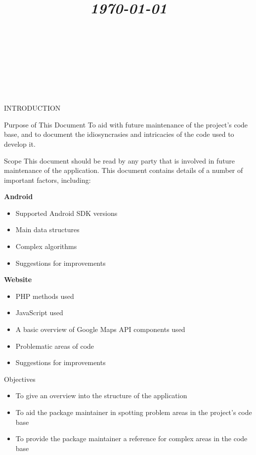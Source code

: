 \documentclass{article}
\title{
	\vspace{1.2in}
	\textmd{\textbf{\doctitle}} \\
	\vspace{0.1in}\large{\textit{\today}} \\
	\vspace{0.4in}
	{\bf{\qanumber}} \\ \vspace{0.4in}
	\version \\
	\status \\
	\vspace{0.4in}
}
\author{\authors}
\date{}
\begin{document}
	\maketitle
	\newpage
	\tableofcontents
	\newpage

	\begin{section}{INTRODUCTION}
		\begin{subsection}{Purpose of This Document}
			To aid with future maintenance of the project's code base, and to document the idiosyncrasies and intricacies of the code used to develop it.
		\end{subsection}
	
		\begin{subsection}{Scope}
			This document should be read by any party that is involved in future maintenance of the application. This document contains details of a number of important factors, including:
			
			{\bf Android}
			\begin{itemize}
				\item{Supported Android SDK versions}
				\item{Main data structures}
				\item{Complex algorithms}
				\item{Suggestions for improvements}
			\end{itemize}
			
			{\bf Website}
			\begin{itemize}
				\item{PHP methods used}
				\item{JavaScript used}
				\item{A basic overview of Google Maps API components used}
				\item{Problematic areas of code}
				\item{Suggestions for improvements}
			\end{itemize}
		\end{subsection}
		
		\begin{subsection}{Objectives}
			\begin{itemize}
				\item{To give an overview into the structure of the application}
				\item{To aid the package maintainer in spotting problem areas in the project's code base}
				\item{To provide the package maintainer a reference for complex areas in the code base}
			\end{itemize}
		\end{subsection}
	\end{section}
	
\end{document}

